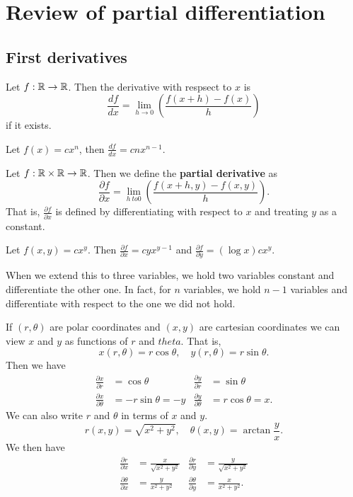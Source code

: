 \chapter{Review of partial differentiation}

\section{First derivatives}

\begin{definition}[Derivative]
    Let $f: \mathbb{R} \to \mathbb{R}$. Then the derivative with respsect to $x$ is \[ \frac{df}{dx} = \lim_{h \to 0} \left( \frac{f(x+h) - f(x)}{h} \right) \] if it exists.
\end{definition}

\begin{example}
    Let $f(x) = cx^n$, then $ \frac{df}{dx} = cnx^{n - 1} $. 
\end{example}

\begin{definition}[]
    Let $f: \mathbb{R} \times \mathbb{R} \to \mathbb{R}$. Then we define the \textbf{partial derivative} as \[ \frac{\partial f}{\partial x} = \lim_{h \ to 0} \left( \frac{f(x+h, y) - f(x, y)}{h} \right).\] That is, $ \frac{\partial f}{\partial x} $ is defined by differentiating with respect to $x$ and treating $y$ as a constant.  
\end{definition}

\begin{example}
    Let $f(x, y) = cx^y$. Then $ \frac{\partial f}{\partial x} = cyx^{y-1}$ and $ \frac{\partial f}{\partial y} = (\log{x})cx^y$.
\end{example}

When we extend this to three variables, we hold two variables constant and differentiate the other one. In fact, for $n$ variables, we hold $n-1$ variables and differentiate with respect to the one we did not hold.

\begin{example}
    If $(r, \theta)$ are polar coordinates and $(x, y)$ are cartesian coordinates we can view $x$ and $y$ as functions of $r$ and $theta$. That is, \[ x(r, \theta) = r \cos{\theta}, \quad y(r, \theta) = r\sin{\theta}. \] Then we have
    \begin{align*}
        \frac{\partial x}{\partial r} &= \cos{\theta} & \frac{\partial y}{\partial r} &= \sin{\theta} \\
        \frac{\partial x}{\partial \theta} &= -r\sin{\theta} = -y & \frac{\partial y}{\partial \theta} &= r\cos{\theta} = x.
    \end{align*}
    We can also write $r$ and $\theta$ in terms of $x$ and $y$. \[ r(x, y) = \sqrt{x^2 + y^2}, \quad \theta(x, y) = \arctan \frac yx. \] We then have
    \begin{align*}
        \frac{\partial r}{\partial x} &= \frac{x}{\sqrt{x^2 + y^2}} & 
            \frac{\partial r}{\partial y} &= \frac{y}{\sqrt{x^2 + y^2}} \\ 
        \frac{\partial \theta}{\partial x} &= \frac{y}{x^2 + y^2} &
        \frac{\partial \theta}{\partial y} &= \frac{x}{x^2 + y^2}. \\
    \end{align*}
\end{example}
